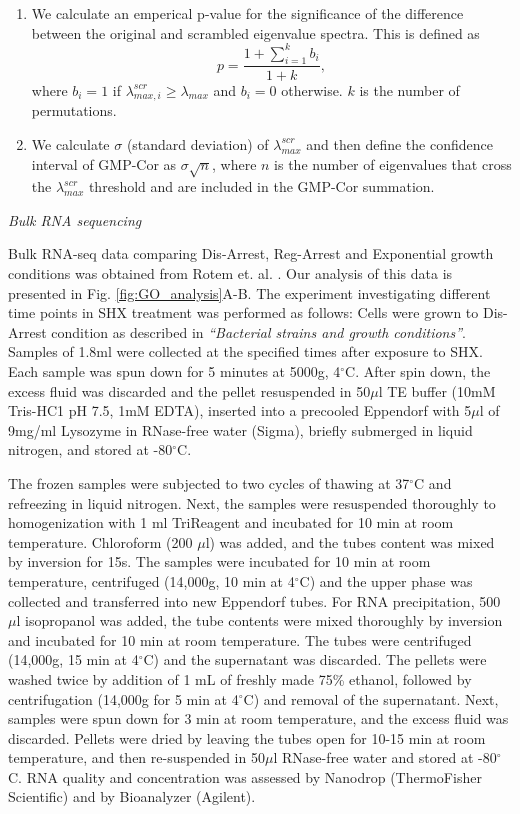 \documentclass[12pt]{article}
\begin{document}
\begin{enumerate}
    \item We calculate an emperical p-value for the significance of the difference between the original and scrambled eigenvalue spectra. This is defined as \begin{equation}
        p=\frac{1+\sum_{i=1}^k{b_i}}{1+k},
    \end{equation} where $b_i=1$ if $\lambda_{max,i}^{scr}\geq\lambda_{max}$ and $b_i=0$ otherwise. $k$ is the number of permutations.
    \item We calculate $\sigma$ (standard deviation) of $\lambda_{max}^{scr}$ and then define the confidence interval of GMP-Cor as $\sigma\sqrt{n}$, where $n$ is the number of eigenvalues that cross the $\lambda_{max}^{scr}$ threshold and are included in the GMP-Cor summation.
\end{enumerate}
\vspace{0.5cm}
\newline
\textit{Bulk RNA sequencing}\par
Bulk RNA-seq data comparing Dis-Arrest, Reg-Arrest and Exponential growth conditions was obtained from Rotem et. al. \cite{Rotem2024}. Our analysis of this data is presented in Fig. \ref{fig:GO_analysis}A-B. The experiment investigating different time points in SHX treatment was performed as follows:
Cells were grown to Dis-Arrest condition as described in \textit{``Bacterial strains and growth conditions''}. Samples of 1.8ml were collected at the specified times after exposure to SHX. Each sample was spun down for 5 minutes at 5000g, 4$^\circ$C. After spin down, the excess fluid was discarded and the pellet resuspended in 50$\mu$l TE buffer (10mM Tris-HC1 pH 7.5, 1mM EDTA), inserted into a precooled Eppendorf with 5$\mu$l of 9mg/ml Lysozyme in RNase-free water (Sigma), briefly submerged in liquid nitrogen, and stored at -80$^\circ$C.\par
The frozen samples were subjected to two cycles of thawing at 37$^\circ$C and refreezing in liquid nitrogen. Next, the samples were resuspended thoroughly to homogenization with 1 ml TriReagent and incubated for 10 min at room temperature. Chloroform (200 $\mu$l) was added, and the tubes content was mixed by inversion for 15s. The samples were incubated for 10 min at room temperature, centrifuged (14,000g, 10 min at 4$^\circ$C) and the upper phase was collected and transferred into new Eppendorf tubes. For RNA precipitation, 500 $\mu$l isopropanol was added, the tube contents were mixed thoroughly by inversion and incubated for 10 min at room temperature. The tubes were centrifuged (14,000g, 15 min at 4$^\circ$C) and the supernatant was discarded. The pellets were washed twice by addition of 1 mL of freshly made 75\% ethanol, followed by centrifugation (14,000g for 5 min at 4$^\circ$C) and removal of the supernatant. Next, samples were spun down for 3 min at room temperature, and the excess fluid was discarded. Pellets were dried by leaving the tubes open for 10-15 min at room temperature, and then re-suspended in 50$\mu$l RNase-free water and stored at -80$^\circ$C. RNA quality and concentration was assessed by Nanodrop (ThermoFisher Scientific) and by Bioanalyzer (Agilent).\par
\end{document}
